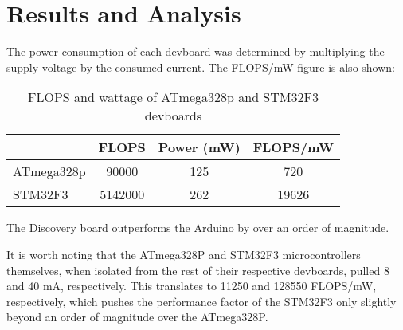 \documentclass[12pt,letterpaper]{article}
\begin{document}
\section*{Results and Analysis}

The power consumption of each devboard was determined by multiplying the supply
voltage by the consumed current. The FLOPS/mW figure is also shown:

\begin{table}[!h]
	\centering
	\caption*{FLOPS and wattage of ATmega328p and STM32F3 devboards}
	\begin{tabular}{|l|c|c|c|} \hline
		           & FLOPS   & Power (mW) & FLOPS/mW \\ \hline\hline
		ATmega328p & 90000   & 125        & 720 \\ \hline
		STM32F3    & 5142000 & 262        & 19626 \\ \hline
	\end{tabular}
\end{table}

The Discovery board outperforms the Arduino by over an order of magnitude.

It is worth noting that the ATmega328P and STM32F3 microcontrollers themselves,
when isolated from the rest of their respective devboards, pulled 8 and 40 mA,
respectively. This translates to 11250 and 128550 FLOPS/mW, respectively, which
pushes the performance factor of the STM32F3 only slightly beyond an order of
magnitude over the ATmega328P.
\end{document}
